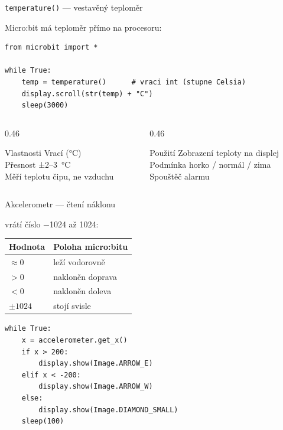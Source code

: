 \begin{frame}[fragile]{\texttt{temperature()} — vestavěný teploměr}

  Micro:bit má teploměr přímo na procesoru:

  \bigskip
  \begin{lstlisting}
from microbit import *

while True:
    temp = temperature()      # vraci int (stupne Celsia)
    display.scroll(str(temp) + "C")
    sleep(3000)
  \end{lstlisting}

  \bigskip
  \begin{columns}[T]
    \begin{column}{0.46\textwidth}
      \begin{block}{Vlastnosti}
        Vrací  (°C)\\
        Přesnost ±2–3~°C\\
        Měří teplotu čipu, ne vzduchu
      \end{block}
    \end{column}
    \begin{column}{0.46\textwidth}
      \begin{block}{Použití}
        Zobrazení teploty na displej\\
        Podmínka horko / normál / zima\\
        Spouštěč alarmu
      \end{block}
    \end{column}
  \end{columns}
\end{frame}

\begin{frame}[fragile]{Akcelerometr — čtení náklonu}

   vrátí číslo −1024 až 1024:

  \bigskip
  \begin{center}
  \begin{tabular}{ll}
    \toprule
    \textbf{Hodnota} & \textbf{Poloha micro:bitu} \\
    \midrule
    $\approx 0$    & leží vodorovně \\
    $> 0$          & nakloněn doprava \\
    $< 0$          & nakloněn doleva \\
    $\pm 1024$     & stojí svisle \\
    \bottomrule
  \end{tabular}
  \end{center}

  \bigskip
  \begin{lstlisting}
while True:
    x = accelerometer.get_x()
    if x > 200:
        display.show(Image.ARROW_E)
    elif x < -200:
        display.show(Image.ARROW_W)
    else:
        display.show(Image.DIAMOND_SMALL)
    sleep(100)
  \end{lstlisting}
\end{frame}

